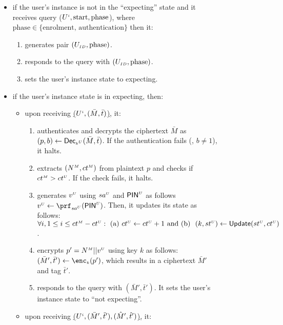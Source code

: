 \begin{figure}[H]
\begin{center}
\begin{tcolorbox}[enhanced,width=3.3in,left=0.1cm, 
    drop fuzzy shadow southwest,
    colframe=black,colback=white]
{{ \begin{itemize}[leftmargin=.4cm]
 \item if the user's instance is not in the ``expecting'' state and it receives query  \send($U^{\scriptscriptstyle i}, \text{start}, \text{phase}$), where $\text{phase}\in \{\text {enrolment, authentication}\}$ then it: 
  \begin{enumerate}
  \item generates pair $(U_{\scriptscriptstyle ID},  \text{phase})$. 
  \item responds to the query with $(U_{\scriptscriptstyle ID},  \text{phase})$. 
  \item sets the user's instance state to expecting.
  \end{enumerate}
 \item if the user's instance state is in expecting, then: 
 \begin{itemize}[leftmargin=.4cm]
 \item upon receiving \underline{\send($U^{\scriptscriptstyle i}, (\bar M, \bar t)$)}, it:
  \begin{enumerate}
  \item authenticates and decrypts the ciphertext $\bar M$ as $(p, b) \gets \mathsf{Dec}_{\scriptscriptstyle k^{\scriptscriptstyle U}}(\bar M, \bar t)$. If the authentication fails (\ie, $b\neq 1$), it halts.  
  \item extracts $({N}^{\scriptscriptstyle M}, {ct}^{\scriptscriptstyle M})$ from plaintext $p$ and checks if ${ct}^{\scriptscriptstyle M} > {ct}^{\scriptscriptstyle U} $. If the check fails, it halts. 
  \item generates ${v}^{\scriptscriptstyle U}$ using ${sa}^{\scriptscriptstyle U}$ and $\mathsf{PIN}^{\scriptscriptstyle U}$ as follows $\VC{\verifier} \gets \prf_{\VC{\salt}}(\VC{\pin})$. Then, it updates its state as follows: $\forall i, 1\leq i\leq {ct}^{\scriptscriptstyle M}- {ct}^{\scriptscriptstyle U}: \text{\ (a)\ } {ct}^{\scriptscriptstyle U} \gets {ct}^{\scriptscriptstyle U} + 1\text{\ and (b) \ } (k,  {st}^{\scriptscriptstyle U}) \gets \mathsf{Update}({st}^{\scriptscriptstyle U}, {ct}^{\scriptscriptstyle U})$. 
  \item encrypts $p'={N}^{\scriptscriptstyle M}||{v}^{\scriptscriptstyle U}$ using key $k$  as follows: $(\bar M', \bar t') \gets \enc_{\sss k}(p')$, which results in a ciphertext $\bar M'$ and tag $\bar t'$. 
  \item responds to the query with $(\bar M', \bar t')$. It sets the user's instance state to ``not expecting''.  
  \end{enumerate}
 \item  upon receiving \underline{\send($U^{\scriptscriptstyle i}, (\ddot M', \ddot t'), (\hat M', \hat t')$)}, it: 
 \begin{enumerate}

\end{enumerate}
\end{itemize}
\end{itemize}}}
\end{tcolorbox}
\end{center}
\end{figure}
